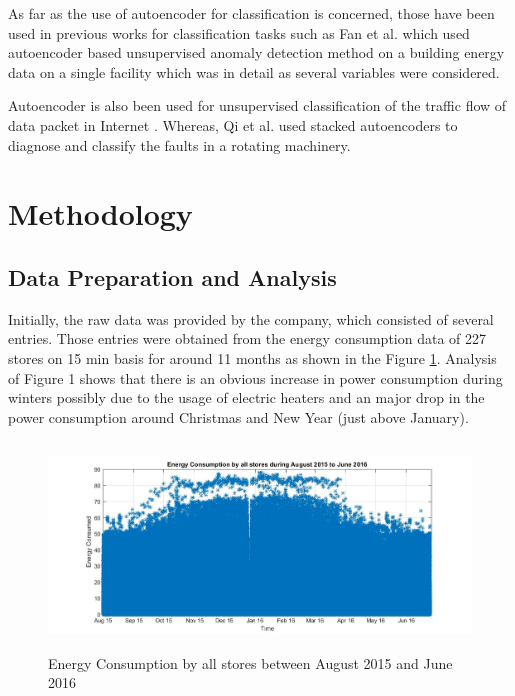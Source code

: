 \documentclass[conference]{IEEEtran}
\begin{document}
As far as the use of autoencoder for classification is concerned, those have been used in previous works for classification tasks such as Fan et al.\cite{bb26} which used autoencoder based unsupervised anomaly detection method on a building energy data on a single facility which was in detail as several variables were considered.

Autoencoder is also been used for unsupervised classification of the traffic flow of data packet in Internet \cite{bb27}.
Whereas, Qi et al. \cite{bb28} used stacked autoencoders to diagnose and classify the faults in a rotating machinery.







\section{Methodology}

\subsection{\label{sec:level1}	Data Preparation and Analysis}

Initially, the raw data was provided by the company, which consisted of
several entries. Those entries were obtained from the energy consumption
data of 227 stores %
on 15 min basis for around
11 months as shown in the Figure \ref{fig:all_stores}. Analysis of Figure 1 shows that there
is an obvious increase in power consumption during winters possibly due to
the usage of electric heaters and an major drop in the power consumption
around Christmas and New Year (just above January).

\begin{figure}[h]
	\centering
	\includegraphics[width=13cm,height=5.5cm]{All_stores.jpg}
	\caption{Energy Consumption by all stores between August 2015 and June 2016}
	\label{fig:all_stores}
\end{figure}
\end{document}
